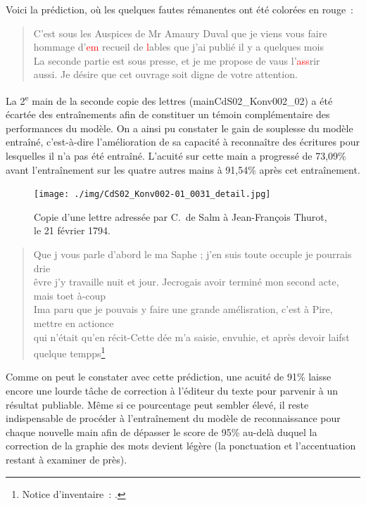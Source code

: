 \documentclass[a4paper,12pt,twoside]{book}
\begin{document}
				Voici la \gls{prédiction}, où les quelques fautes rémanentes ont été colorées en rouge~:
				
				\label{comp-perf-mod}
				\begin{quote}
					\textsf{C'est sous les Auspices de Mr Amaury Duval que je viens vous faire\\
					hommage d'\textcolor{red}{em} recueil de \textcolor{red}{l}ables que j'ai publié il y a quelques mois\\
					La seconde partie est sous presse, et je me propose de vaus l'\textcolor{red}{ass}rir\\
					aussi. Je désire que cet ouvrage soit digne de votre attention.}
				\end{quote}
							
				La 2\textsuperscript{e} main de la seconde copie des lettres (\textsf{mainCdS02\_Konv002\_02}) a été écartée des entraînements afin de constituer un témoin complémentaire des performances du modèle. On a ainsi pu constater le gain de souplesse du modèle entraîné, c'est-à-dire l'amélioration de sa capacité à reconnaître des écritures pour lesquelles il n'a pas été entraîné. L'acuité sur cette main a progressé de 73,09\% avant l'entraînement sur les quatre autres mains à 91,54\% après cet entraînement.
				
				\begin{figure}[!h]
					\centering
					\texttt{[image: ./img/CdS02\_Konv002-01\_0031\_detail.jpg]}%
					\caption{Copie d'une lettre adressée par C.~de Salm à Jean-François Thurot, le 21 février 1794.}%
					\label{}%
				\end{figure}
				
				\begin{quote}
					\scriptsize \textsf{Que j vous parle d'abord le ma Saphe ; j'en suis toute occuple je pourrais drie\\
					êvre j'y travaille nuit et jour. Jecrogais avoir terminé mon second acte, mais toet à-coup\\
					Ima paru que je pouvais y faire une grande amélisration, c'est à Pire, mettre en actionce\\
					qui n'était qu'en récit-Cette dée m'a saisie, envuhie, et après devoir laifst quelque tempps}\footnote{Notice d'inventaire~: \cite{CdS02031032}.}
				\end{quote}
			
				Comme on peut le constater avec cette \gls{prédiction}, une acuité de 91\% laisse encore une lourde tâche de correction à l'éditeur du texte pour parvenir à un résultat publiable. Même si ce pourcentage peut sembler élevé, il reste indispensable de procéder à l'entraînement du modèle de reconnaissance pour chaque nouvelle main afin de dépasser le score de 95\% au-delà duquel la correction de la graphie des mots devient légère (la ponctuation et l'accentuation restant à examiner de près).
			
\end{document}
